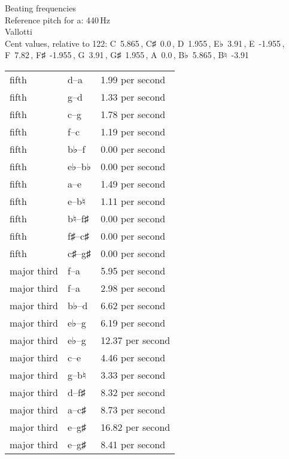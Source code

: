 \documentclass{standalone}
\def\str{\textquotesingle}
\def\cn{\textcent}
\begin{document}
\begin{minipage}{8cm}
\begin{center}
  {\Large Beating frequencies}\\[2ex]
  Reference pitch for a\str: 440\,Hz\\[1ex]
  Vallotti\\[1ex]
  Cent values, relative to 122: C~5.865\,\cn, C♯~0.0\,\cn, D~1.955\,\cn, E♭~3.91\,\cn, E~-1.955\,\cn, F~7.82\,\cn, F♯~-1.955\,\cn, G~3.91\,\cn, G♯~1.955\,\cn, A~0.0\,\cn, B♭~5.865\,\cn, B♮~-3.91\,\cn
\end{center}
\begin{longtable}{p{2cm}p{1cm}p{3cm}}
  \toprule
  fifth & d\str--a\str & 1.99 per second \\fifth & g--d\str & 1.33 per second \\fifth & c\str--g\str & 1.78 per second \\fifth & f--c\str & 1.19 per second \\fifth & b♭--f\str & 0.00 per second \\fifth & e♭--b♭ & 0.00 per second \\fifth & a--e\str & 1.49 per second \\fifth & e--b♮ & 1.11 per second \\fifth & b♮--f♯\str & 0.00 per second \\fifth & f♯--c♯\str & 0.00 per second \\fifth & c♯\str--g♯\str & 0.00 per second \\major third & f\str--a\str & 5.95 per second \\major third & f--a & 2.98 per second \\major third & b♭--d\str & 6.62 per second \\major third & e♭--g & 6.19 per second \\major third & e♭\str--g\str & 12.37 per second \\major third & c\str--e\str & 4.46 per second \\major third & g--b♮ & 3.33 per second \\major third & d\str--f♯\str & 8.32 per second \\major third & a--c♯\str & 8.73 per second \\major third & e\str--g♯\str & 16.82 per second \\major third & e--g♯ & 8.41 per second \\
  \bottomrule
\end{longtable}
\end{minipage}
\end{document}
